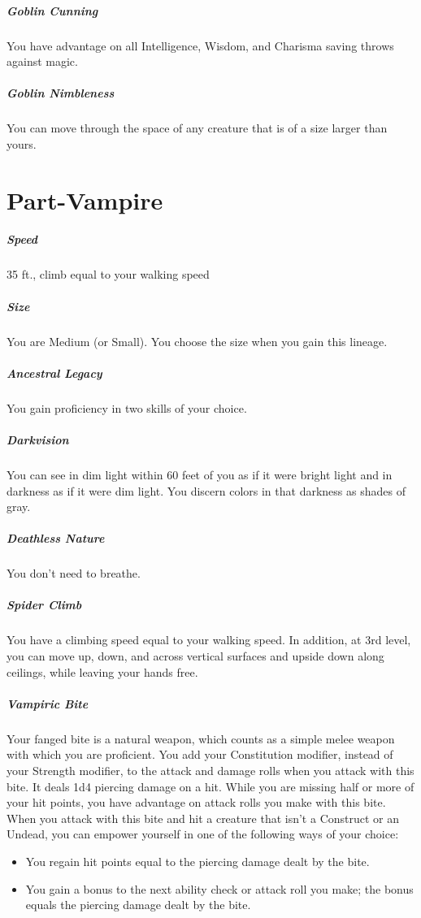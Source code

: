 \documentclass[a4paper,twocolumn,openany,nodeprecatedcode]{dndbook}
\begin{document}
        \subparagraph{Goblin Cunning} You have advantage on all Intelligence, Wisdom, and Charisma saving throws against magic.

        \subparagraph{Goblin Nimbleness} You can move through the space of any creature that is of a size larger than yours.


    \section{Part-Vampire}

        \subparagraph{Speed} 35 ft., climb equal to your walking speed

        \subparagraph{Size} You are Medium (or Small). You choose the size when you gain this lineage.

        \subparagraph{Ancestral Legacy} You gain proficiency in two skills of your choice.

        \subparagraph{Darkvision} You can see in dim light within 60 feet of you as if it were bright light and in darkness as if it were dim light. You discern colors in that darkness as shades of gray.

        \subparagraph{Deathless Nature} You don't need to breathe.

        \subparagraph{Spider Climb} You have a climbing speed equal to your walking speed. In addition, at 3rd level, you can move up, down, and across vertical surfaces and upside down along ceilings, while leaving your hands free.

        \subparagraph{Vampiric Bite} Your fanged bite is a natural weapon, which counts as a simple melee weapon with which you are proficient. You add your Constitution modifier, instead of your Strength modifier, to the attack and damage rolls when you attack with this bite. It deals 1d4 piercing damage on a hit. While you are missing half or more of your hit points, you have advantage on attack rolls you make with this bite.\\
        When you attack with this bite and hit a creature that isn't a Construct or an Undead, you can empower yourself in one of the following ways of your choice:

        \begin{itemize}
            \item You regain hit points equal to the piercing damage dealt by the bite.
            \item You gain a bonus to the next ability check or attack roll you make; the bonus equals the piercing damage dealt by the bite.
        \end{itemize}
\end{document}
